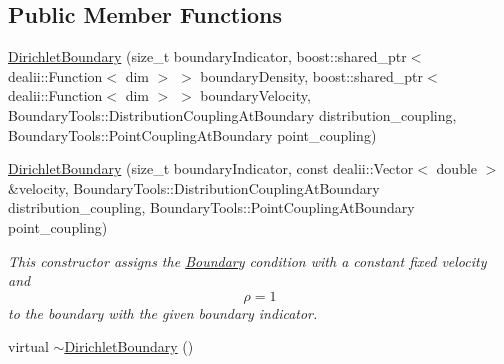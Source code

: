 \subsection*{Public Member Functions}
\begin{DoxyCompactItemize}
\item 
\hyperlink{classnatrium_1_1DirichletBoundary_a58366f152d702561d9d30584e2c6970b}{DirichletBoundary} (size\_\-t boundaryIndicator, boost::shared\_\-ptr$<$ dealii::Function$<$ dim $>$ $>$ boundaryDensity, boost::shared\_\-ptr$<$ dealii::Function$<$ dim $>$ $>$ boundaryVelocity, BoundaryTools::DistributionCouplingAtBoundary distribution\_\-coupling, BoundaryTools::PointCouplingAtBoundary point\_\-coupling)
\item 
\hyperlink{classnatrium_1_1DirichletBoundary_a7f0b83d5c09a113a1c9ad025704962f9}{DirichletBoundary} (size\_\-t boundaryIndicator, const dealii::Vector$<$ double $>$ \&velocity, BoundaryTools::DistributionCouplingAtBoundary distribution\_\-coupling, BoundaryTools::PointCouplingAtBoundary point\_\-coupling)
\begin{DoxyCompactList}\small\item\em This constructor assigns the \hyperlink{classnatrium_1_1Boundary}{Boundary} condition with a constant fixed velocity and \[ \rho = 1 \] to the boundary with the given boundary indicator. \item\end{DoxyCompactList}\item 
\hypertarget{classnatrium_1_1DirichletBoundary_a5ce674b82ca4dc5bec9e03b40e55b095}{
virtual \hyperlink{classnatrium_1_1DirichletBoundary_a5ce674b82ca4dc5bec9e03b40e55b095}{$\sim$DirichletBoundary} ()}
\label{classnatrium_1_1DirichletBoundary_a5ce674b82ca4dc5bec9e03b40e55b095}


\end{DoxyCompactItemize}
